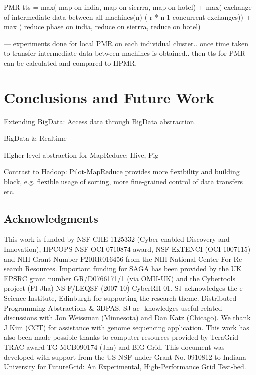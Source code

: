 \documentclass{acm_proc_article-sp}
\begin{document}
PMR tts = max( map  on india, map on  sierrra, map on hotel) + max( exchange of intermediate data between all machines(n) ( r * n-1 concurrent exchanges)) + max ( reduce phase on  india, reduce on  sierrra, reduce on hotel)

--- experiments done for local PMR on each individual cluster.. once time 
taken to transfer intermediate data between machines is obtained.. then tts 
for PMR can be calculated and compared to HPMR.


\section{Conclusions and Future Work}


Extending BigData: Access data through BigData abstraction.

BigData \& Realtime

Higher-level abstraction for MapReduce: Hive, Pig


Contrast to Hadoop:
Pilot-MapReduce provides more flexibility and building block, e.g. flexible 
usage of sorting, more fine-grained control of data transfers etc.

%

%
%
%


\subsection*{Acknowledgments}
\scriptsize
This work is funded by NSF CHE-1125332 (Cyber-enabled Discovery and
Innovation), HPCOPS NSF-OCI 0710874 award, NSF-ExTENCI (OCI-1007115) and NIH
Grant Number P20RR016456 from the NIH National Center For Re- search
Resources. Important funding for SAGA has been provided by the UK EPSRC grant
number GR/D0766171/1 (via OMII-UK) and the Cybertools project (PI Jha) 
NS-F/LEQSF (2007-10)-CyberRII-01. SJ acknowledges the e-Science Institute,
Edinburgh for supporting the research theme. Distributed Programming
Abstractions \& 3DPAS. SJ ac- knowledges useful related discussions with Jon
Weissman (Minnesota) and Dan Katz (Chicago). We thank J Kim (CCT) for
assistance with genome sequencing application. This work has also been made
possible thanks to computer resources provided by TeraGrid TRAC award
TG-MCB090174 (Jha) and BiG Grid. This document was developed with support from
the US NSF under Grant No. 0910812 to Indiana University for FutureGrid: An
Experimental, High-Performance Grid Test-bed.
\end{document}

